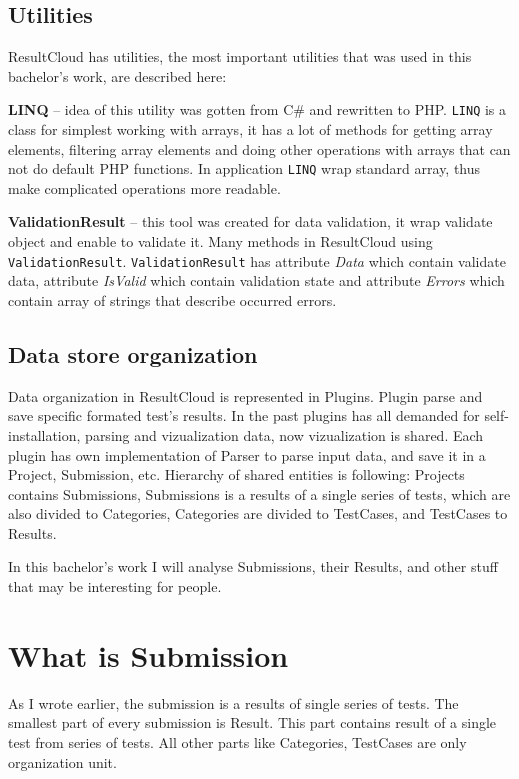 \subsection{Utilities}

ResultCloud has utilities, the most important utilities that was used in this bachelor's work, are described here:

\textbf{LINQ} -- idea of this utility was gotten from C\# and rewritten to PHP. \texttt{LINQ} is a class for simplest working with arrays, it has a lot of methods for getting array elements, filtering array elements and doing other operations with arrays that can not do default PHP functions. In application \texttt{LINQ} wrap standard array, thus make complicated operations more readable.  

\textbf{ValidationResult} -- this tool was created for data validation, it wrap validate object and enable to validate it. Many methods in ResultCloud using \texttt{ValidationResult}. \texttt{ValidationResult} has attribute \emph{Data} which contain validate data, attribute \emph{IsValid} which contain validation state and attribute \emph{Errors} which contain array of strings that describe occurred errors.

\subsection{Data store organization}

Data organization in ResultCloud is represented in Plugins. Plugin parse and save specific formated test's results. In the past plugins has all demanded for self-installation, parsing and vizualization data, now vizualization is shared. 
Each plugin has own implementation of Parser to parse input data, and save it in a Project, Submission, etc. Hierarchy of shared entities is following: Projects  contains Submissions, Submissions is a results of a single series of tests, which are also divided to Categories, Categories are divided to TestCases, and TestCases to Results.

In this bachelor's work I will analyse Submissions, their Results, and other stuff that may be interesting for people.

\section{What is Submission}

As I wrote earlier, the submission is a results of single series of tests. The smallest part of every submission is Result. This part contains result of a single test from series of tests. All other parts like Categories, TestCases are only organization unit. 

